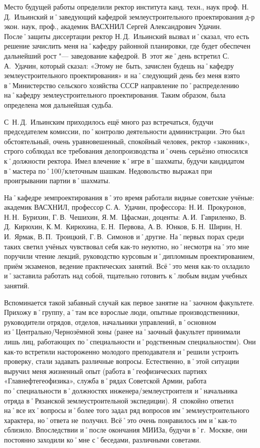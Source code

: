 Место будущей работы определили ректор института канд. техн., наук проф. Н.\,Д.~Ильинский и˚заведующий кафедрой землеустроительного проектирования д-р экон. наук, проф., академик ВАСХНИЛ Сергей Александрович Удачин. После˚защиты диссертации ректор Н.\,Д.~Ильинский вызвал и˚сказал, что есть решение зачислить меня на˚кафедру районной планировки, где будет обеспечен дальнейший рост "--- заведование кафедрой. В~этот же˚день встретил С.\,А.~Удачин, который сказал: «Этому не~быть, зачислен будешь на˚кафедру землеустроительного проектирования» и на˚следующий день без меня взято в˚Министерство сельского хозяйства СССР направление по˚распределению на˚кафедру землеустроительного проектирования. Таким образом, была определена моя дальнейшая судьба. 

С~Н.\,Д.~Ильинским приходилось ещё много раз встречаться, будучи председателем комиссии, по˚контролю деятельности администрации. Это был обстоятельный, очень уравновешенный, спокойный человек, ректор «законник», строго соблюдал все требования делопроизводства и˚очень серьёзно относился к˚должности ректора. Имел влечение к˚игре в˚шахматы, будучи кандидатом в˚мастера по˚100\=/клеточным шашкам. Недовольство выражал при проигрывании партии в˚шахматы.

На˚кафедре земпроектирования в˚это время работали видные советские учёные: академик ВАСХНИЛ, профессор С.\,А.~Удачин, профессора: Н.\,И.~Прокуронов, Н.\,Н.~Бурихин, Г.\,В.~Чешихин, Я.\,М.~Цфасман, доценты: А.\,И.~Гавриленко, В.\,Д.~Кирюхин, К.\,М.~Кирюхина, Е.\,Н.~Первова, А.\,В.~Юнков, Б.\,Н.~Ширин, Н.\,И.~Ярмак, В.\,П.~Троицкий, Г.\,В.~Симонов и˚другие. На˚первых порах среди таких светил учёных чувствовал себя как-то неуютно, но˚несмотря на˚это мне поручили чтение лекций, руководство курсовым и˚дипломным проектированием, приём экзаменов, ведение практических занятий. Всё˚это меня как-то охладило и˚заставила работать над собой, тщательно готовить к˚любым видам учебных занятий.

Вспоминается такой забавный случай как первое занятие на˚заочном факультете. Прихожу в˚группу, а˚там все взрослые люди, опытные производственники, руководители отрядов, отделов, начальники управлений, в˚основном из˚Центрально\-/Чернозёмной зоны (ранее на˚заочный факультет принимали лишь лиц, работающих по˚специальности и˚родственным специальностям). Они как-то встретили настороженно молодого преподавателя и˚решили устроить проверку, стали задавать различные вопросы. Естественно, в˚этой ситуации выручил меня жизненный опыт (работа в˚геофизических партиях «Главнефтегеофизика», служба в˚рядах Советской Армии, работа по˚специальности в˚должностях инженера\-/землеустроителя и˚начальника отряда в˚Рязанской землеустроительной экспедиции). Я~спокойно ответил на˚все их˚вопросы и˚более того задал ряд вопросов им˚землеустроительного характера, но˚ответа не~получил. Всё˚это очень понравилось им и˚как-то сблизило. Впоследствии и˚после окончания МИИЗа, будучи в˚г.~Москве, они постоянно заходили ко˚мне с˚беседами, различными советами. 

